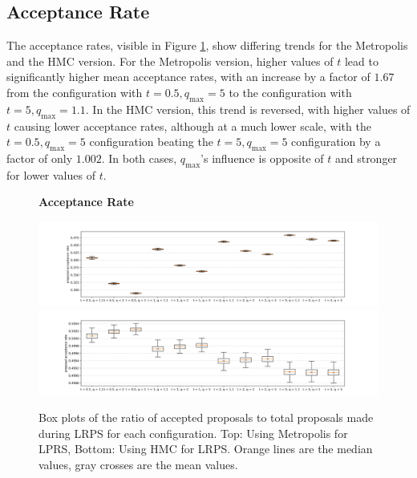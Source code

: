 \documentclass[12pt, a4paper]{report}
\begin{document}
\subsection{Acceptance Rate}
The acceptance rates, visible in Figure \ref{fig:results_params_acceptance_rates}, show differing trends for the Metropolis and the HMC version.
For the Metropolis version, higher values of $t$ lead to significantly higher mean acceptance rates, with an increase by a factor of $1.67$ from the configuration with $t=0.5, q_{\textrm{max}}=5$ to the configuration with $t=5, q_{\textrm{max}}=1.1$.
In the HMC version, this trend is reversed, with higher values of $t$ causing lower acceptance rates, although at a much lower scale, with the $t=0.5, q_{\textrm{max}}=5$ configuration beating the $t=5, q_{\textrm{max}}=5$ configuration by a factor of only $1.002$.
In both cases, $q_{\textrm{max}}$'s influence is opposite of $t$ and stronger for lower values of $t$.
\begin{figure}
    \centering
    {\small \textbf{Acceptance Rate} \par}
    \includegraphics[trim={3cm 0cm 3cm 0cm}, clip, width=\textwidth]{figs/results/params/acceptance_rates_metropolis.png}
    \includegraphics[trim={3cm 0cm 3cm 0cm}, clip, width=\textwidth]{figs/results/params/acceptance_rates_hmc.png}
    \caption{Box plots of the ratio of accepted proposals to total proposals made during LRPS for each configuration. Top: Using Metropolis for LPRS, Bottom: Using HMC for LRPS. Orange lines are the median values, gray crosses are the mean values.}
    \label{fig:results_params_acceptance_rates}
\end{figure}
\end{document}
